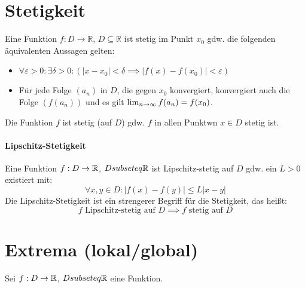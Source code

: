    \section{Stetigkeit}
        Eine Funktion $ f : D \rightarrow \mathbb{R} $, $ D \subseteq \mathbb{R} $ ist stetig im Punkt $ x _ 0 $ gdw. die folgenden äquivalenten Aussagen gelten:
        \begin{itemize}
            \item $ \forall \varepsilon > 0 : \exists \delta > 0 : (\lvert x - x _ 0 \rvert < \delta \implies \lvert f(x) - f(x _ 0) \rvert < \varepsilon) $
            \item Für jede Folge $ (a _ n) $ in $ D $, die gegen $ x _ 0 $ konvergiert, konvergiert auch die Folge $ (f(a _ n)) $ und es gilt $ \lim_{n \to \infty} f(a _ n) = f(x _ 0) $.
        \end{itemize}
        Die Funktion $ f $ ist stetig (auf $ D $) gdw. $ f $ in allen Punktwn $ x \in D $ stetig ist.

        \paragraph{Lipschitz-Stetigkeit}
            Eine Funktion $ f : D \rightarrow \mathbb{R} $, $ D subseteq \mathbb{R} $ ist Lipschitz-stetig auf $ D $ gdw. ein $ L > 0 $ existiert mit:
            \begin{equation}
                \forall x, y \in D : \lvert f(x) - f(y) \rvert \leq L \lvert x - y \rvert
            \end{equation}
            Die Lipschitz-Stetigkeit ist ein strengerer Begriff für die Stetigkeit, das heißt: \[ f \text{ Lipschitz-stetig auf } D \implies f \text{ stetig auf } D \]

    \section{Extrema (lokal/global)}
        Sei $ f : D \rightarrow \mathbb{R} $, $ D subseteq \mathbb{R} $ eine Funktion.

